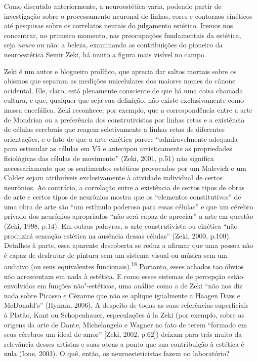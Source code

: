 Como discutido anteriormente, a neuroestética varia, podendo partir de
investigação sobre o processamento neuronal de linhas, cores e contornos
cinéticos até pesquisas sobre os correlatos neurais do julgamento
estético. Iremos nos concentrar, no primeiro momento, nas preocupações
fundamentais da estética, seja \emph{neuro} ou não: a beleza, examinando
as contribuições do pioneiro da neuroestética Semir Zeki, há muito a
figura mais visível no campo.

Zeki é um autor e blogueiro prolífico, que aprecia dar saltos mortais
sobre os abismos que separam as medições unicelulares dos maiores nomes
do cânone ocidental. Ele, claro, está plenamente consciente de que há
uma coisa chamada cultura, e que, qualquer que seja sua definição, não
existe exclusivamente como massa encefálica. Zeki reconhece, por
exemplo, que a correspondência entre a arte de Mondrian ou a preferência
dos construtivistas por linhas retas e a existência de células cerebrais
que reagem seletivamente a linhas retas de diferentes orientações, e o
fato de que a arte cinética parece ``admiravelmente adequada para
estimular as células em V5 e antecipou artisticamente as propriedades
fisiológicas das células de movimento'' (Zeki, 2001, p.51) não significa
necessariamente que os sentimentos estéticos provocados por um Malevich
e um Calder sejam atribuíveis exclusivamente à atividade individual de
certos neurônios. Ao contrário, a correlação entre a existência de
certos tipos de obras de arte e certos tipos de neurônios mostra que os
``elementos constitutivos'' de uma obra de arte são ``um estímulo
poderoso para essas células'' e que um cérebro privado dos neurônios
apropriados ``não será capaz de apreciar'' a arte em questão (Zeki,
1998, p.14). Em outras palavras, a arte construtivista ou cinética ``não
produzirá sensação estética na ausência dessas células'' (Zeki, 2000,
p.100). Detalhes à parte, essa aparente descoberta se reduz a afirmar
que uma pessoa não é capaz de desfrutar de pintura sem um sistema visual
ou música sem um auditivo (ou seus equivalentes
funcionais).\textsuperscript{18} Portanto, esses achados tao óbvios não
acrescentam em nada à estética. E como esses sistemas de percepção estão
envolvidos em funções não"-estéticas, uma análise como a de Zeki ``não
nos diz nada sobre Picasso e Cézanne que não se aplique igualmente a
Häagen Dazs e McDonald's'' (Hyman, 2006). A despeito de todas as suas
referências superficiais à Platão, Kant ou Schopenhauer, especulações à
la Zeki (por exemplo, sobre as origens da arte de Dante, Michelangelo e
Wagner no fato de terem ``formado em seus cérebros um ideal de amor''
{[}Zeki, 2002, p.62{]}) deixam para trás muito da relevância desses
artistas e suas obras a ponto que sua contribuição à estética é nula
(Ione, 2003). O quê, então, os neuroesteticistas fazem no laboratório?

